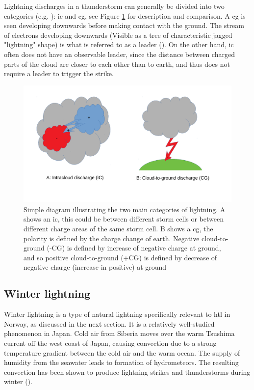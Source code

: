 Lightning discharges in a thunderstorm can generally be divided into two categories (e.g. \cite{lynn2011}): \acrfull{ic} and \acrfull{cg}, see Figure \ref{fig:lyntyper} for description and comparison. A \acrshort{cg} is seen developing downwards before making contact with the ground. The stream of electrons developing downwards (Visible as a tree of characteristic jagged "lightning" shape) is what is referred to as a leader (\cite{rakovBok}). On the other hand, \acrshort{ic} often does not have an observable leader, since the distance between charged parts of the cloud are closer to each other than to earth, and thus does not require a leader to trigger the strike.

\begin{figure}
    \centering
    \includegraphics[width=\textwidth]{Figures/lyntyper.pdf}
    \caption{Simple diagram illustrating the two main categories of lightning. A shows an \acrfull{ic}, this could be between different storm cells or between different charge areas of the same storm cell. B shows a \acrfull{cg}, the polarity is defined by the charge change of earth. Negative cloud-to-ground (-CG) is defined by increase of negative charge at ground, and so positive cloud-to-ground (+CG) is defined by decrease of negative charge (increase in positive) at ground}
    \label{fig:lyntyper}
\end{figure}

\subsection{Winter lightning}
Winter lightning is a type of natural lightning specifically relevant to \acrshort{htl} in Norway, as discussed in the next section. It is a relatively well-studied phenomenon in Japan. Cold air from Siberia moves over the warm Tsushima current off the west coast of Japan, causing convection due to a strong temperature gradient between the cold air and the warm ocean. The supply of humidity from the seawater leads to formation of hydrometeors. The resulting convection has been shown to produce lightning strikes and thunderstorms during winter (\cite{michimoto2007}).

